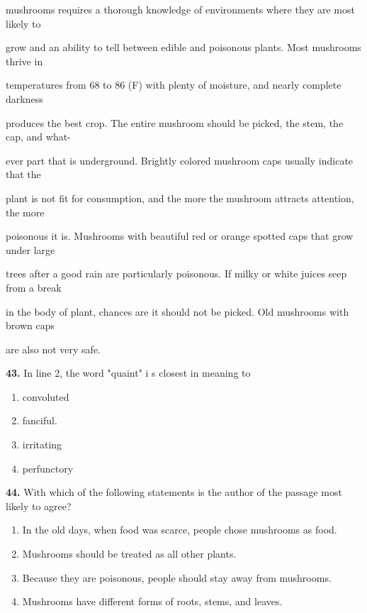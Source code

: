 \documentclass[12pt]{article}
\begin{document}
mushrooms requires a thorough knowledge of environments where they are most likely to\par
grow and an ability to tell between edible and poisonous plants. Most mushrooms thrive in\par
temperatures from 68 to 86 (F) with plenty of moisture, and nearly complete darkness\par
produces the best crop. The entire mushroom should be picked, the stem, the cap, and what-\par
ever part that is underground. Brightly colored mushroom caps usually indicate that the\par
plant is not fit for consumption, and the more the mushroom attracts attention, the more\par
poisonous it is. Mushrooms with beautiful red or orange spotted caps that grow under large\par
trees after a good rain are particularly poisonous. If milky or white juices seep from a break\par
in the body of plant, chances are it should not be picked. Old mushrooms with brown caps\par
are also not very safe.\par
\endgroup
\medskip
\noindent\textbf{43.} In line 2, the word "quaint" i s closest in meaning to
\begin{enumerate}[label=(\Alph*),leftmargin=*,itemsep=0.2em]
\item convoluted
\item fanciful.
\item irritating
\item perfunctory
\end{enumerate}
\par
\vspace{0.25\baselineskip}
\noindent\textbf{44.} With which of the following statements is the author of the passage most likely to agree?
\begin{enumerate}[label=(\Alph*),leftmargin=*,itemsep=0.2em]
\item In the old days, when food was scarce, people chose mushrooms as food.
\item Mushrooms should be treated as all other plants.
\item Because they are poisonous, people should stay away from mushrooms.
\item Mushrooms have different forms of roots, stems, and leaves.
\end{enumerate}
\par
\end{document}
